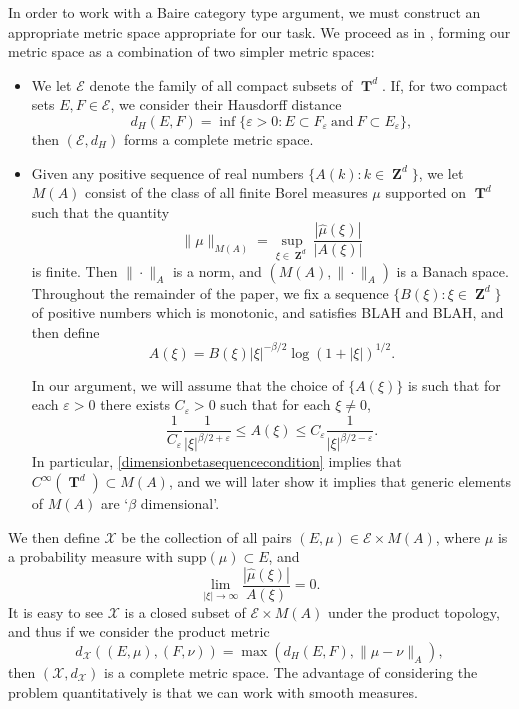 \documentclass[12pt,reqno]{article}
\numberwithin{equation}{section}
\DeclareMathOperator{\ZZ}{\mathbf{Z}}
\DeclareMathOperator{\TT}{\mathbf{T}}
\begin{document}
In order to work with a Baire category type argument, we must construct an appropriate metric space appropriate for our task. We proceed as in \cite{Korner2}, forming our metric space as a combination of two simpler metric spaces:
%
\begin{itemize}
    \item We let $\mathcal{E}$ denote the family of all compact subsets of $\TT^d$. If, for two compact sets $E,F \in \mathcal{E}$, we consider their Hausdorff distance
    \[ d_H(E,F) = \inf \{ \varepsilon > 0 : E \subset F_\varepsilon\ \text{and}\ F \subset E_\varepsilon \}, \]
    then $(\mathcal{E},d_H)$ forms a complete metric space.

    \item Given any positive sequence of real numbers $\{ A(k) : k \in \ZZ^d \}$, we let $M(A)$ consist of the class of all finite Borel measures $\mu$ supported on $\TT^d$ such that the quantity
    \[ \| \mu \|_{M(A)} = \sup_{\xi \in \ZZ^d} \frac{|\widehat{\mu}(\xi)|}{|A(\xi)|} \]
    is finite. Then $\| \cdot \|_A$ is a norm, and $(M(A), \| \cdot \|_A)$ is a Banach space. Throughout the remainder of the paper, we fix a sequence $\{ B(\xi) : \xi \in \ZZ^d \}$ of positive numbers which is monotonic, and satisfies BLAH and BLAH, and then define
    \[ A(\xi) = B(\xi) |\xi|^{-\beta/2} \log(1 + |\xi|)^{1/2}. \]

    In our argument, we will assume that the choice of $\{ A(\xi) \}$ is such that for each $\varepsilon > 0$ there exists $C_\varepsilon > 0$ such that for each $\xi \neq 0$,
    \begin{equation} \label{dimensionbetasequencecondition}
        \frac{1}{C_\varepsilon} \frac{1}{|\xi|^{\beta/2 + \varepsilon}} \leq A(\xi) \leq C_\varepsilon \frac{1}{|\xi|^{\beta/2 - \varepsilon}}.
    \end{equation}
    In particular, \eqref{dimensionbetasequencecondition} implies that $C^\infty(\TT^d) \subset M(A)$, and we will later show it implies that generic elements of $M(A)$ are `$\beta$ dimensional'.
\end{itemize}
%
We then define $\mathcal{X}$ be the collection of all pairs $(E,\mu) \in \mathcal{E} \times M(A)$, where $\mu$ is a probability measure with $\text{supp}(\mu) \subset E$, and
%
\[ \lim_{|\xi| \to \infty} \frac{|\widehat{\mu}(\xi)|}{A(\xi)} = 0. \]
%
It is easy to see $\mathcal{X}$ is a closed subset of $\mathcal{E} \times M(A)$ under the product topology, and thus if we consider the product metric
%
\[ d_{\mathcal{X}}((E,\mu),(F,\nu)) = \max \left( d_H(E,F), \| \mu - \nu \|_A \right), \]
%
then $(\mathcal{X},d_\mathcal{X})$ is a complete metric space. The advantage of considering the problem quantitatively is that we can work with smooth measures.
\end{document}
